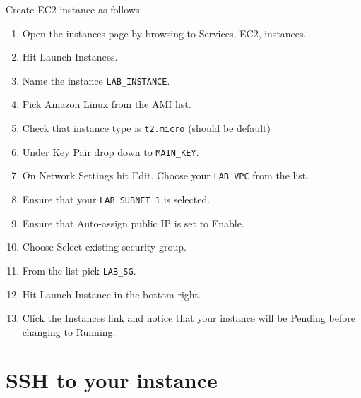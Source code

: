 \documentclass{pgnotes}
\begin{document}
Create EC2 instance as follows:
\begin{enumerate}
\item Open the instances page by browsing to Services, EC2, instances.

\item Hit Launch Instances.

\item Name the instance \texttt{LAB\_INSTANCE}.

\item Pick Amazon Linux from the AMI list.

\item Check that instance type is \texttt{t2.micro} (should be default)

\item Under Key Pair drop down to \texttt{MAIN\_KEY}.

\item On Network Settings hit Edit. Choose your \texttt{LAB\_VPC} from the list.

\item Ensure that your \texttt{LAB\_SUBNET\_1} is selected.

\item Ensure that Auto-assign public IP is set to Enable.
  
\item Choose Select existing security group.

\item From the list pick \texttt{LAB\_SG}.

\item Hit Launch Instance in the bottom right.

\item Click the Instances link and notice that your instance will be Pending before changing to Running.
  
\end{enumerate}

\section{SSH to your instance}
\end{document}
